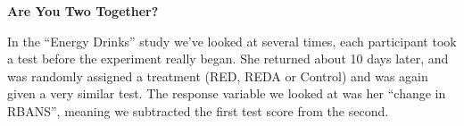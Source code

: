 \def\theTopic{Pairing }
\def\dayNum{26 }


\begin{center}
{\bf {\large Are You Two Together? }}\\
\end{center}



   In the ``Energy Drinks'' study we've looked at
  several times, each participant took a test  before the
  experiment really began. She  returned about 10 days later, and was
  randomly assigned a treatment (RED, REDA or Control) and was again
  given a very similar test.  The response variable we looked at
  was her ``change in RBANS'', meaning we subtracted the first test
  score from the second.   

